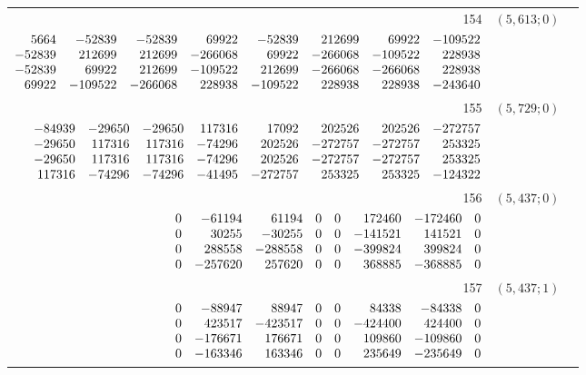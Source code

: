 \documentclass[11pt]{article}
\theoremstyle{remark}
\numberwithin{equation}{section}
\begin{document}
\begin{longtable}{rcl}
154 & $(5,613;0)$ & \begin{tabular}[t]{@{}l@{}}$w_i=\displaystyle \frac{64450163453280917}{12563784648287565030400000000000000000}$\\[3pt]{\scriptsize$\begin{array}{@{}rrrrrrrr@{}}5664 & -52839 & -52839 & 69922 & -52839 & 212699 & 69922 & -109522\\-52839 & 212699 & 212699 & -266068 & 69922 & -266068 & -109522 & 228938\\-52839 & 69922 & 212699 & -109522 & 212699 & -266068 & -266068 & 228938\\69922 & -109522 & -266068 & 228938 & -109522 & 228938 & 228938 & -243640\end{array}$}\end{tabular}\\[8pt]
155 & $(5,729;0)$ & \begin{tabular}[t]{@{}l@{}}$w_i=\displaystyle \frac{4353630263669553}{63265668438845521600000000000000000}$\\[3pt]{\scriptsize$\begin{array}{@{}rrrrrrrr@{}}-84939 & -29650 & -29650 & 117316 & 17092 & 202526 & 202526 & -272757\\-29650 & 117316 & 117316 & -74296 & 202526 & -272757 & -272757 & 253325\\-29650 & 117316 & 117316 & -74296 & 202526 & -272757 & -272757 & 253325\\117316 & -74296 & -74296 & -41495 & -272757 & 253325 & 253325 & -124322\end{array}$}\end{tabular}\\[8pt]
156 & $(5,437;0)$ & \begin{tabular}[t]{@{}l@{}}$w_i=\displaystyle \frac{2185743559064587}{3517617923316190000000000000000000}$\\[3pt]{\scriptsize$\begin{array}{@{}rrrrrrrr@{}}0 & -61194 & 61194 & 0 & 0 & 172460 & -172460 & 0\\0 & 30255 & -30255 & 0 & 0 & -141521 & 141521 & 0\\0 & 288558 & -288558 & 0 & 0 & -399824 & 399824 & 0\\0 & -257620 & 257620 & 0 & 0 & 368885 & -368885 & 0\end{array}$}\end{tabular}\\[8pt]
157 & $(5,437;1)$ & \begin{tabular}[t]{@{}l@{}}$w_i=\displaystyle \frac{17207575118691417}{21339370413697321025000000000000000}$\\[3pt]{\scriptsize$\begin{array}{@{}rrrrrrrr@{}}0 & -88947 & 88947 & 0 & 0 & 84338 & -84338 & 0\\0 & 423517 & -423517 & 0 & 0 & -424400 & 424400 & 0\\0 & -176671 & 176671 & 0 & 0 & 109860 & -109860 & 0\\0 & -163346 & 163346 & 0 & 0 & 235649 & -235649 & 0\end{array}$}\end{tabular}\\[8pt]

\end{longtable}
\end{document}
